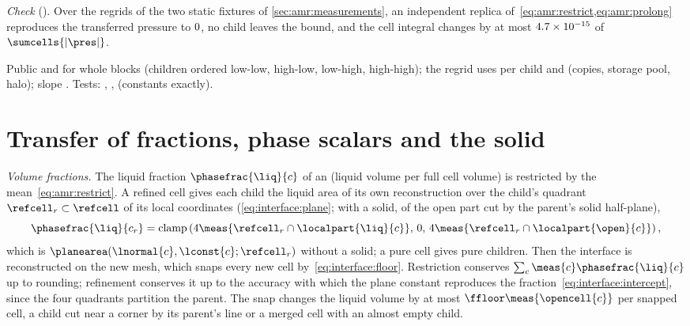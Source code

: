 \emph{Check} (). Over the \chkAmrRegrids{} regrids of
the two static fixtures of \cref{sec:amr:measurements}, an independent replica
of~\cref{eq:amr:restrict,eq:amr:prolong} reproduces the transferred pressure
to $0$, no child leaves the bound, and the cell integral
changes by at most $4.7\times10^{-15}$ of $\sumcells{\abs{\pres}}$.

\begin{implnote}
Public  and
 for whole blocks (children
ordered low-low, high-low, low-high, high-high); the regrid uses
 per child and
 (copies,
storage pool, halo); slope . Tests:
,
,
(constants exactly).
\end{implnote}

\section{Transfer of fractions, phase scalars and the solid}\label{sec:amr:phase}
\emph{Volume fractions.} The liquid fraction $\phasefrac{\liq}{c}$ of an
 (liquid volume per full cell volume) is restricted
by the mean~\cref{eq:amr:restrict}. A refined cell gives each child the
liquid area of its own reconstruction over the child's quadrant
$\refcell_r\subset\refcell$ of its local coordinates
(\cref{eq:interface:plane}; with a solid, of the open part cut by the parent's
solid half-plane),
\begin{equation}\label{eq:amr:vof}
  \phasefrac{\liq}{c_r}=\operatorname{clamp}\roundpar{4\meas{\refcell_r\cap\localpart{\liq}{c}},\,0,\,4\meas{\refcell_r\cap\localpart{\open}{c}}},
\end{equation}
which is $\planearea(\lnormal{c},\lconst{c};\refcell_r)$ without a solid; a
pure cell gives pure children. Then the interface is reconstructed on the new
mesh, which snaps every new cell by~\cref{eq:interface:floor}. Restriction
conserves $\sum_c\meas{c}\phasefrac{\liq}{c}$ up to rounding; refinement
conserves it up to the accuracy with which the plane constant reproduces the
fraction~\cref{eq:interface:intercept}, since the four quadrants partition
the parent. The snap changes the liquid volume by at most
$\ffloor\meas{\opencell{c}}$ per snapped cell, a child cut near a corner by
its parent's line or a merged cell with an almost empty child.

